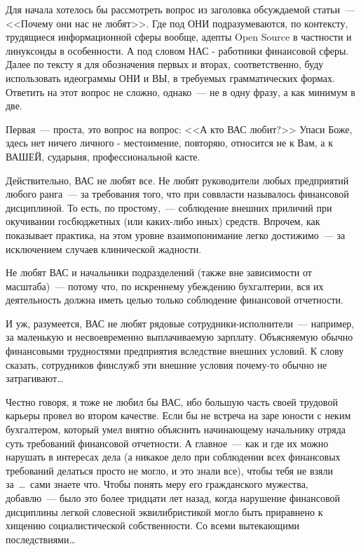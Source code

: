 Для начала хотелось бы рассмотреть вопрос из заголовка обсуждаемой статьи~--- <<Почему они нас не любят>>. Где под ОНИ подразумеваются, по контексту, трудящиеся информационной сферы вообще, адепты Open Source в частности и линуксоиды в особенности. А под словом НАС - работники финансовой сферы. Далее по тексту я для обозначения первых и вторах, соответственно, буду использовать идеограммы ОНИ и ВЫ, в требуемых грамматических формах. Ответить на этот вопрос не сложно, однако~--- не в одну фразу, а как минимум в две.

Первая~--- проста, это вопрос на вопрос: <<А кто ВАС любит?>> Упаси Боже, здесь нет ничего личного - местоимение, повторяю, относится не к Вам, а к ВАШЕЙ, сударыня, профессиональной касте.

Действительно, ВАС не любят все. Не любят руководители любых предприятий любого ранга~--- за требования того, что при соввласти называлось финансовой дисциплиной. То есть, по простому,~--- соблюдение внешних приличий при окучивании госбюджетных (или каких-либо иных) средств. Впрочем, как показывает практика, на этом уровне взаимопонимание легко достижимо~--- за исключением случаев клинической жадности.

Не любят ВАС и начальники подразделений (также вне зависимости от масштаба)~--- потому что, по искреннему убеждению бухгалтерии, вся их деятельность должна иметь целью только соблюдение финансовой отчетности.

И уж, разумеется, ВАС не любят рядовые сотрудники-исполнители~---  например, за маленькую и несвоевременно выплачиваемую зарплату. Объясняемую обычно финансовыми трудностями предприятия вследствие внешних условий. К слову сказать, сотрудников финслужб эти внешние условия почему-то обычно не затрагивают\dots

Честно говоря, я тоже не любил бы ВАС, ибо большую часть своей трудовой карьеры провел во втором качестве. Если бы не встреча на заре юности с неким бухгалтером, который умел внятно объяснить начинающему начальнику отряда суть требований финансовой отчетности. А главное~--- как и где их можно нарушать в интересах дела (а никакое дело при соблюдении всех финансовых требований делаться просто не могло, и это знали все), чтобы тебя не взяли за~\dots~сами знаете что. Чтобы понять меру его гражданского мужества, добавлю~--- было это более тридцати лет назад, когда нарушение финансовой дисциплины легкой словесной эквилибристикой могло быть приравнено к хищению социалистической собственности. Со всеми вытекающими последствиями\dots

